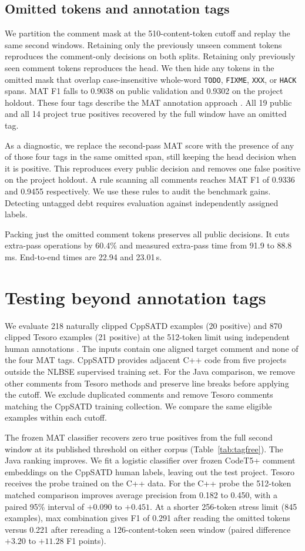 \documentclass[10pt,conference]{IEEEtran}
\begin{document}
\subsection{Omitted tokens and annotation tags}
We partition the comment mask at the 510-content-token cutoff and replay the same second windows. Retaining only the previously unseen comment tokens reproduces the comment-only decisions on both splits. Retaining only previously seen comment tokens reproduces the head. We then hide any tokens in the omitted mask that overlap case-insensitive whole-word \texttt{TODO}, \texttt{FIXME}, \texttt{XXX}, or \texttt{HACK} spans. MAT F1 falls to 0.9038 on public validation and 0.9302 on the project holdout. These four tags describe the MAT annotation approach \cite{russo}. All 19 public and all 14 project true positives recovered by the full window have an omitted tag.

As a diagnostic, we replace the second-pass MAT score with the presence of any of those four tags in the same omitted span, still keeping the head decision when it is positive. This reproduces every public decision and removes one false positive on the project holdout. A rule scanning all comments reaches MAT F1 of 0.9336 and 0.9455 respectively. We use these rules to audit the benchmark gains. Detecting untagged debt requires evaluation against independently assigned labels.

Packing just the omitted comment tokens preserves all public decisions. It cuts extra-pass operations by 60.4\% and measured extra-pass time from 91.9 to 88.8\,ms. End-to-end times are 22.94 and 23.01\,s.

\section{Testing beyond annotation tags}
We evaluate 218 naturally clipped CppSATD examples (20 positive) and 870 clipped Tesoro examples (21 positive) at the 512-token limit using independent human annotations \cite{cppsatd,cppsatddata,tesoro}. The inputs contain one aligned target comment and none of the four MAT tags. CppSATD provides adjacent C++ code from five projects outside the NLBSE supervised training set. For the Java comparison, we remove other comments from Tesoro methods and preserve line breaks before applying the cutoff. We exclude duplicated comments and remove Tesoro comments matching the CppSATD training collection. We compare the same eligible examples within each cutoff.

The frozen MAT classifier recovers zero true positives from the full second window at its published threshold on either corpus (Table~\ref{tab:tagfree}). The Java ranking improves. We fit a logistic classifier over frozen CodeT5+ comment embeddings on the CppSATD human labels, leaving out the test project. Tesoro receives the probe trained on the C++ data. For the C++ probe the 512-token matched comparison improves average precision from 0.182 to 0.450, with a paired 95\% interval of $+0.090$ to $+0.451$. At a shorter 256-token stress limit (845 examples), max combination gives F1 of 0.291 after reading the omitted tokens versus 0.221 after rereading a 126-content-token seen window (paired difference $+3.20$ to $+11.28$ F1 points).
\end{document}
